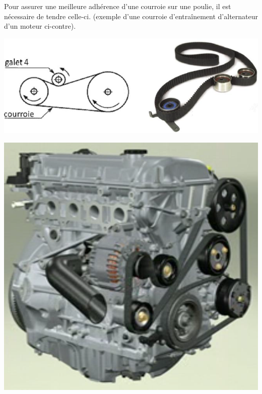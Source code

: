 \documentclass[10pt]{article}
\begin{document}
\noindent\begin{minipage}[c]{.6\linewidth}
Pour assurer une meilleure adhérence d’une courroie sur une
poulie, il est nécessaire de tendre celle-ci. (exemple d’une
courroie d’entraînement d’alternateur d’un moteur ci-contre).
\begin{center}
\includegraphics[width=.9\textwidth]{images/fig01_5}
\end{center}
\end{minipage} \hfill
\begin{minipage}[c]{.35\linewidth}
\begin{center}
\includegraphics[width=.9\textwidth]{images/fig01_4}
\end{center}
\end{minipage}

\vspace{.5cm}
\end{document}
